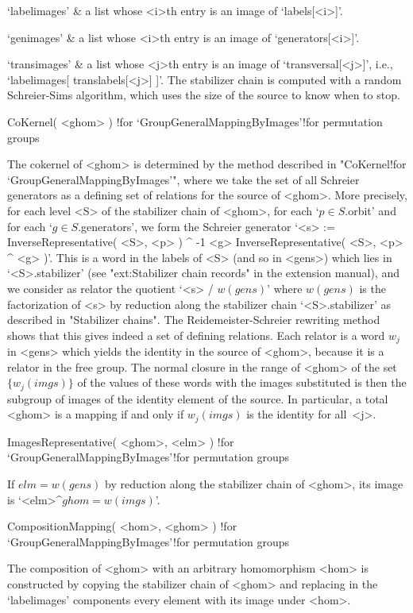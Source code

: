 `labelimages' &
        a list whose <i>th entry is an image of `labels[<i>]'.

`genimages' &
        a list whose <i>th entry is an image of `generators[<i>]'.

`transimages' &
        a list whose <j>th entry is an image of `transversal[<j>]', i.e.,
        `labelimages[ translabels[<j>] ]'.
\enditems
The stabilizer  chain is computed with  a random Schreier-Sims algorithm,
which uses the size of the source to know when to stop.

\>CoKernel( <ghom> )%
  !{for `GroupGeneralMappingByImages'!for permutation groups}

The  cokernel   of  <ghom>  is  determined by   the   method described in
"CoKernel!for  `GroupGeneralMappingByImages'", where  we  take the set of
all Schreier generators as a defining set of relations  for the source of
<ghom>. More precisely, for  each  level <S>  of the stabilizer  chain of
<ghom>, for each `$p\in S$.orbit'  and for each `$g\in S$.generators', we
form the Schreier generator  `<s> := InverseRepresentative(  <S>, <p> ) ^
-1 \* <g> \* InverseRepresentative( <S>, <p> ^ <g>  )'. This is a word in
the labels of <S> (and so in  <gens>) which lies in `<S>.stabilizer' (see
"ext:Stabilizer chain records" in the  extension manual), and we consider
as  relator  the  quotient  `<s>  /  $w(gens)$' where  $w(gens)$   is the
factorization  of   <s>   by   reduction  along  the   stabilizer   chain
`<S>.stabilizer'   as    described    in "Stabilizer     chains".     The
Reidemeister-Schreier rewriting method shows that this gives indeed a set
of defining   relations. Each relator  is  a word $w_j$   in <gens> which
yields the identity in the source  of <ghom>, because  it is a relator in
the free group. The  normal closure  in the  range of  <ghom> of the  set
$\{w_j(imgs)\}$ of the values of  these words with the images substituted
is then the subgroup of images of the identity  element of the source. In
particular, a total <ghom> is a mapping if and only if $w_j(imgs)$ is the
identity for all~<j>.

\>ImagesRepresentative( <ghom>, <elm> )%
  !{for `GroupGeneralMappingByImages'!for permutation groups}

If $elm=w(gens)$  by reduction along  the stabilizer chain of <ghom>, its
image is `<elm>^$ghom=w(imgs)$'.

\>CompositionMapping( <hom>, <ghom> )%
  !{for `GroupGeneralMappingByImages'!for permutation groups}

The  composition  of  <ghom>  with   an arbitrary homomorphism   <hom> is
constructed  by copying the  stabilizer chain of  <ghom> and replacing in
the `labelimages' components every element with its image under <hom>.


